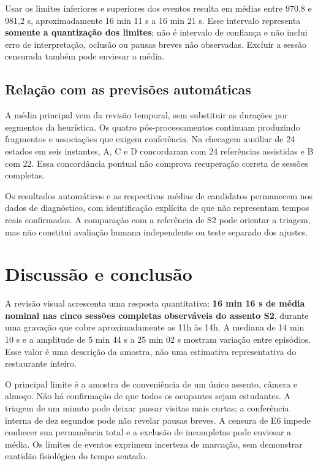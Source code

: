 \documentclass[12pt,a4paper,twoside,openany,chapter=TITLE,subsection=TITLE,section=TITLE,subsubsection=TITLE,english,brazil]{abntex2}
\begin{document}
Usar os limites inferiores e superiores dos eventos resulta em médias entre 970,8 e 981,2 s, aproximadamente 16 min 11 s a 16 min 21 s. Esse intervalo representa \textbf{somente a quantização dos limites}; não é intervalo de confiança e não inclui erro de interpretação, oclusão ou pausas breves não observadas. Excluir a sessão censurada também pode enviesar a média.

\section{Relação com as previsões automáticas}
A média principal vem da revisão temporal, sem substituir as durações por segmentos da heurística. Os quatro pós-processamentos continuam produzindo fragmentos e associações que exigem conferência. Na checagem auxiliar de 24 estados em seis instantes, A, C e D concordaram com 24 referências assistidas e B com 22. Essa concordância pontual não comprova recuperação correta de sessões completas.

Os resultados automáticos e as respectivas médias de candidatos permanecem nos dados de diagnóstico, com identificação explícita de que não representam tempos reais confirmados. A comparação com a referência de S2 pode orientar a triagem, mas não constitui avaliação humana independente ou teste separado dos ajustes.

\clearpage
\chapter{Discussão e conclusão}
A revisão visual acrescenta uma resposta quantitativa: \textbf{16 min 16 s de média nominal nas cinco sessões completas observáveis do assento S2}, durante uma gravação que cobre aproximadamente as 11h às 14h. A mediana de 14 min 10 s e a amplitude de 5 min 44 s a 25 min 02 s mostram variação entre episódios. Esse valor é uma descrição da amostra, não uma estimativa representativa do restaurante inteiro.

O principal limite é a amostra de conveniência de um único assento, câmera e almoço. Não há confirmação de que todos os ocupantes sejam estudantes. A triagem de um minuto pode deixar passar visitas mais curtas; a conferência interna de dez segundos pode não revelar pausas breves. A censura de E6 impede conhecer sua permanência total e a exclusão de incompletas pode enviesar a média. Os limites de eventos exprimem incerteza de marcação, sem demonstrar exatidão fisiológica do tempo sentado.
\end{document}
